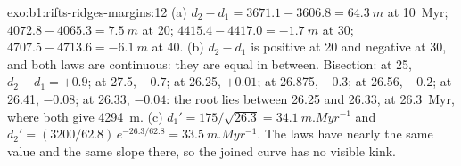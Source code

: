 \begin{solution}{exo:b1:rifts-ridges-margins:12}
(a) $d_2 - d_1 = 3671.1 - 3606.8 = \qty{64.3}{m}$ at \qty{10}{Myr};
$4072.8 - 4065.3 = \qty{7.5}{m}$ at 20; $4415.4 - 4417.0 = \qty{-1.7}{m}$ at
30; $4707.5 - 4713.6 = \qty{-6.1}{m}$ at 40. (b) $d_2 - d_1$ is positive at 20
and negative at 30, and both laws are continuous: they are equal in between.
Bisection: at 25, $d_2 - d_1 = +0.9$; at 27.5, $-0.7$; at 26.25, $+0.01$; at
26.875, $-0.3$; at 26.56, $-0.2$; at 26.41, $-0.08$; at 26.33, $-0.04$: the
root lies between 26.25 and 26.33, at \qty{26.3}{Myr}, where both give
\qty{4294}{m}. (c) $d_1' = 175/\sqrt{26.3} = \qty{34.1}{m.Myr^{-1}}$ and
$d_2' = (3200/62.8)\,e^{-26.3/62.8} = \qty{33.5}{m.Myr^{-1}}$. The laws have
nearly the same value and the same slope there, so the joined curve has no
visible kink.
\end{solution}

